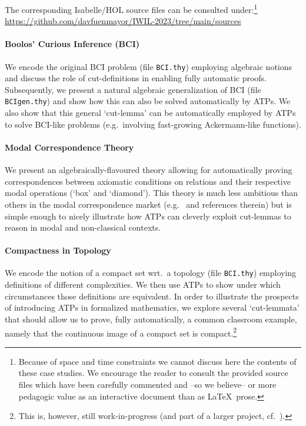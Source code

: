 \documentclass{article}
\begin{document}
The corresponding Isabelle/HOL source files can be consulted under:\footnote{Because of space and time constraints we cannot discuss here the contents of these case studies. We encourage the reader to consult the provided source files which have been carefully commented and --so we believe-- or more pedagogic value as an interactive document than as \LaTeX\ prose.} \\ \url{https://github.com/davfuenmayor/IWIL-2023/tree/main/sources}

\paragraph*{Boolos' Curious Inference (BCI)}
We encode the original BCI problem (file \texttt{BCI.thy}) employing algebraic notions and discuss the role of cut-definitions in enabling fully automatic proofs. Subsequently, we present a natural algebraic generalization of BCI (file \texttt{BCIgen.thy}) and show how this can also be solved automatically by ATPs. We also show that this general `cut-lemma' can be automatically employed by ATPs to solve BCI-like problems (e.g.~involving fast-growing Ackermann-like functions).

\paragraph*{Modal Correspondence Theory}
We present an algebraically-flavoured theory allowing for automatically proving correspondences between axiomatic conditions on relations and their respective modal operations (`box' and `diamond'). This theory is much less ambitious than others in the modal correspondence market (e.g.~\cite{Conradie2012} and references therein) but is simple enough to nicely illustrate how ATPs can cleverly exploit cut-lemmas to reason in modal and non-classical contexts.

\paragraph*{Compactness in Topology}
We encode the notion of a compact set wrt.~a topology (file \texttt{BCI.thy}) employing definitions of different complexities. We then use ATPs to show under which circumstances those definitions are equivalent. In order to illustrate the prospects of introducing ATPs in formalized mathematics, we explore several `cut-lemmata' that should allow us to prove, fully automatically, a common classroom example, namely that the continuous image of a compact set is compact.\footnote{This is, however, still work-in-progress (and part of a larger project, cf.~\cite{CICM22}).}
\\ 










 

\end{document}
